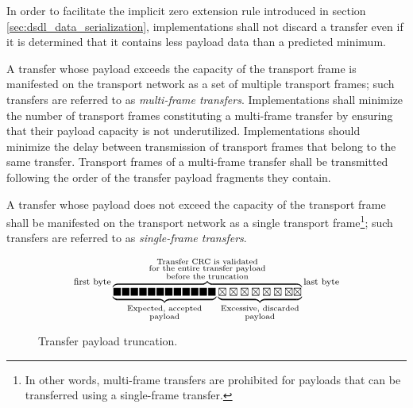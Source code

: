 In order to facilitate the implicit zero extension rule introduced in section \ref{sec:dsdl_data_serialization},
implementations shall not discard a transfer even if it is determined that it contains less payload
data than a predicted minimum.

A transfer whose payload exceeds the capacity of the transport frame is manifested on the transport network
as a set of multiple transport frames; such transfers are referred to as \emph{multi-frame transfers}.
Implementations shall minimize the number of transport frames constituting a multi-frame transfer by ensuring that
their payload capacity is not underutilized.
Implementations should minimize the delay between transmission of transport frames that belong to the same transfer.
Transport frames of a multi-frame transfer shall be transmitted following the order of the
transfer payload fragments they contain.

A transfer whose payload does not exceed the capacity of the transport frame shall be manifested on the transport
network as a single transport frame\footnote{%
    In other words, multi-frame transfers are prohibited for payloads that can be transferred
    using a single-frame transfer.
}; such transfers are referred to as \emph{single-frame transfers}.

\begin{figure}[H]
    $$
    \raisebox{1em}{\footnotesize{\text{first byte}}}
    \overbrace{%
        \underbrace{%
            \blacksquare\blacksquare\blacksquare\blacksquare\blacksquare\blacksquare%
            \blacksquare\blacksquare\blacksquare\blacksquare\blacksquare\blacksquare%
        }_{\substack{\text{Expected, accepted} \\ \text{payload}}}%
        \underbrace{%
            \boxtimes\boxtimes\boxtimes\boxtimes\boxtimes\boxtimes\boxtimes\boxtimes%
        }_{\substack{\text{Excessive, discarded} \\ \text{payload}}}%
    }^{\substack{%
        \text{Transfer CRC is validated} \\
        \text{for the entire transfer payload} \\
        \text{before the truncation}}
    }
    \raisebox{1em}{\footnotesize{\text{last byte}}}
    $$
    \caption{Transfer payload truncation.\label{fig:transport_payload_truncation}}
\end{figure}

